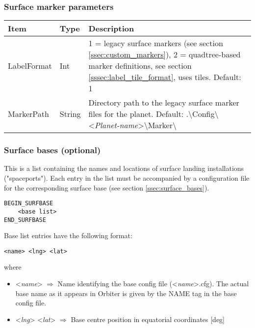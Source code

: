 \documentclass[Orbiter Developer Manual.tex]{subfiles}
\begin{document}
\subsubsection*{Surface marker parameters}
	\begin{longtable}{ |p{}|p{}|p{}| }
	\hline\rule{0pt}{2ex}
	\textbf{Item} & \textbf{Type} & \textbf{Description}\\
	\hline\rule{0pt}{2ex}
	LabelFormat & Int & 1 = legacy surface markers (see section \ref{ssec:custom_markers}), 2 = quadtree-based marker definitions, see section \ref{sssec:label_tile_format}, uses tiles. Default: 1\\
	\hline\rule{0pt}{2ex}
	MarkerPath & String & Directory path to the legacy surface marker files for the planet. Default: .\textbackslash Config\textbackslash <\textit{Planet-name}>\textbackslash Marker\textbackslash \\
	\hline
	\end{longtable}


\subsubsection*{Surface bases (optional)}
This is a list containing the names and locations of surface landing installations ("spaceports"). Each entry in the list must be accompanied by a configuration file for the corresponding surface base (see section \ref{ssec:surface_bases}).

\begin{lstlisting}[language=OSFS]
BEGIN_SURFBASE
	<base list>
END_SURFBASE
\end{lstlisting}

\noindent
Base list entries have the following format:

\begin{lstlisting}[language=OSFS]
<name> <lng> <lat>
\end{lstlisting}

\noindent
where

\begin{itemize}
\item <\textit{name}> $\Rightarrow$ Name identifying the base config file (<\textit{name}>.cfg). The actual base name as it appears in Orbiter is given by the NAME tag in the base config file.
\item <\textit{lng}> <\textit{lat}> $\Rightarrow$ Base centre position in equatorial coordinates [deg]
\end{itemize}
\end{document}
